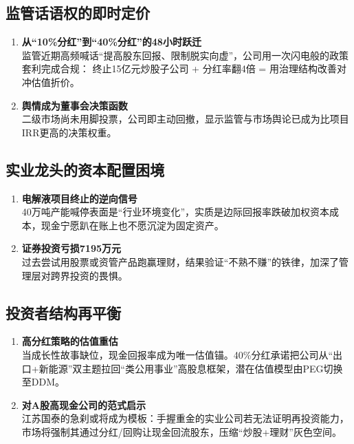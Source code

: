 \subsection{监管话语权的即时定价}
\begin{enumerate}[leftmargin=*, nosep]
    \item \textbf{从“10\%分红”到“40\%分红”的48小时跃迁}  \\
    监管近期高频喊话“提高股东回报、限制脱实向虚”，公司用一次闪电般的政策套利完成合规：  
    终止15亿元炒股子公司 + 分红率翻4倍 = 用治理结构改善对冲估值折价。  
    \item \textbf{舆情成为董事会决策函数}  \\
    二级市场尚未用脚投票，公司即主动回撤，显示监管与市场舆论已成为比项目IRR更高的决策权重。
\end{enumerate}

\subsection{实业龙头的资本配置困境}
\begin{enumerate}[leftmargin=*, nosep]
    \item \textbf{电解液项目终止的逆向信号}  \\
    40万吨产能喊停表面是“行业环境变化”，实质是边际回报率跌破加权资本成本，现金宁愿趴在账上也不愿沉淀为固定资产。  
    \item \textbf{证券投资亏损7195万元}  \\
    过去尝试用股票或资管产品跑赢理财，结果验证“不熟不赚”的铁律，加深了管理层对跨界投资的畏惧。
\end{enumerate}

\subsection{投资者结构再平衡}
\begin{enumerate}[leftmargin=*, nosep]
    \item \textbf{高分红策略的估值重估}  \\
    当成长性故事缺位，现金回报率成为唯一估值锚。40\%分红承诺把公司从“出口+新能源”双主题拉回“类公用事业”高股息框架，潜在估值模型由PEG切换至DDM。  
    \item \textbf{对A股高现金公司的范式启示}  \\
    江苏国泰的急刹或将成为模板：手握重金的实业公司若无法证明再投资能力，市场将强制其通过分红/回购让现金回流股东，压缩“炒股+理财”灰色空间。
\end{enumerate}

